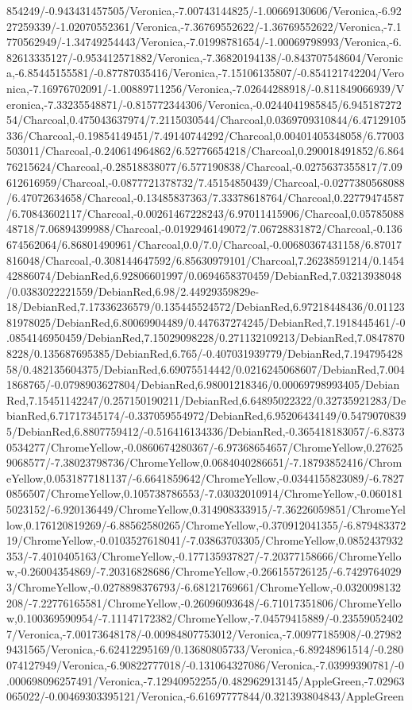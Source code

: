 {\begin{tikzternal}
854249/-0.943431457505/Veronica,-7.00743144825/-1.00669130606/Veronica,-6.9227259339/-1.02070552361/Veronica,-7.36769552622/-1.36769552622/Veronica,-7.1770562949/-1.34749254443/Veronica,-7.01998781654/-1.00069798993/Veronica,-6.82613335127/-0.953412571882/Veronica,-7.36820194138/-0.843707548604/Veronica,-6.85445155581/-0.87787035416/Veronica,-7.15106135807/-0.854121742204/Veronica,-7.16976702091/-1.00889711256/Veronica,-7.02644288918/-0.811849066939/Veronica,-7.33235548871/-0.815772344306/Veronica,-0.0244041985845/6.94518727254/Charcoal,0.475043637974/7.2115030544/Charcoal,0.0369709310844/6.47129105336/Charcoal,-0.19854149451/7.49140744292/Charcoal,0.00401405348058/6.77003503011/Charcoal,-0.240614964862/6.52776654218/Charcoal,0.290018491852/6.86476215624/Charcoal,-0.28518838077/6.577190838/Charcoal,-0.0275637355817/7.09612616959/Charcoal,-0.0877721378732/7.45154850439/Charcoal,-0.0277380568088/6.47072634658/Charcoal,-0.13485837363/7.33378618764/Charcoal,0.22779474587/6.70843602117/Charcoal,-0.00261467228243/6.97011415906/Charcoal,0.0578508848718/7.06894399988/Charcoal,-0.0192946149072/7.06728831872/Charcoal,-0.136674562064/6.86801490961/Charcoal,0.0/7.0/Charcoal,-0.00680367431158/6.87017816048/Charcoal,-0.308144647592/6.85630979101/Charcoal,7.26238591214/0.145442886074/DebianRed,6.92806601997/0.0694658370459/DebianRed,7.03213938048/0.0383022221559/DebianRed,6.98/2.44929359829e-18/DebianRed,7.17336236579/0.135445524572/DebianRed,6.97218448436/0.0112381978025/DebianRed,6.80069904489/0.447637274245/DebianRed,7.1918445461/-0.0854146950459/DebianRed,7.15029098228/0.271132109213/DebianRed,7.08478708228/0.135687695385/DebianRed,6.765/-0.407031939779/DebianRed,7.19479542858/0.482135604375/DebianRed,6.69075514442/0.0216245068607/DebianRed,7.0041868765/-0.0798903627804/DebianRed,6.98001218346/0.00069798993405/DebianRed,7.15451142247/0.257150190211/DebianRed,6.64895022322/0.32735921283/DebianRed,6.71717345174/-0.337059554972/DebianRed,6.95206434149/0.54790708395/DebianRed,6.8807759412/-0.516416134336/DebianRed,-0.365418183057/-6.83730534277/ChromeYellow,-0.0860674280367/-6.97368654657/ChromeYellow,0.276259068577/-7.38023798736/ChromeYellow,0.0684040286651/-7.18793852416/ChromeYellow,0.0531877181137/-6.6641859642/ChromeYellow,-0.0344155823089/-6.78270856507/ChromeYellow,0.105738786553/-7.03032010914/ChromeYellow,-0.0601815023152/-6.920136449/ChromeYellow,0.314908333915/-7.36226059851/ChromeYellow,0.176120819269/-6.88562580265/ChromeYellow,-0.370912041355/-6.87948337219/ChromeYellow,-0.0103527618041/-7.03863703305/ChromeYellow,0.0852437932353/-7.4010405163/ChromeYellow,-0.177135937827/-7.20377158666/ChromeYellow,-0.26004354869/-7.20316828686/ChromeYellow,-0.266155726125/-6.74297640293/ChromeYellow,-0.0278898376793/-6.68121769661/ChromeYellow,-0.0320098132208/-7.22776165581/ChromeYellow,-0.26096093648/-6.71017351806/ChromeYellow,0.100369590954/-7.11147172382/ChromeYellow,-7.04579415889/-0.235590524027/Veronica,-7.00173648178/-0.00984807753012/Veronica,-7.00977185908/-0.279829431565/Veronica,-6.62412295169/0.13680805733/Veronica,-6.89248961514/-0.280074127949/Veronica,-6.90822777018/-0.131064327086/Veronica,-7.03999390781/-0.000698096257491/Veronica,-7.12940952255/0.482962913145/AppleGreen,-7.02963065022/-0.00469303395121/Veronica,-6.61697777844/0.321393804843/AppleGreen
\end{tikzternal}}
